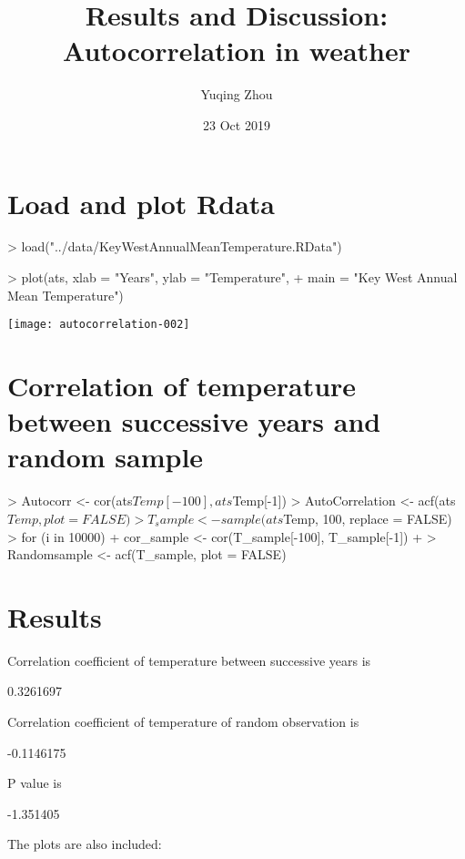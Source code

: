 \documentclass[a4paper]{article}
\title{Results and Discussion: Autocorrelation in weather}
\author{Yuqing Zhou}
\date{23 Oct 2019}
\begin{document}
 \maketitle

\section{Load and plot Rdata}
\begin{Schunk}
\begin{Sinput}
> load("../data/KeyWestAnnualMeanTemperature.RData") 
\end{Sinput}
\end{Schunk}

\begin{center}
\begin{Schunk}
\begin{Sinput}
> plot(ats, xlab = "Years", ylab = "Temperature",
+     main = "Key West Annual Mean Temperature")
\end{Sinput}
\end{Schunk}
\texttt{[image: autocorrelation-002]}
\end{center}

\section{Correlation of temperature between successive years and random sample}
\begin{Schunk}
\begin{Sinput}
> Autocorr <- cor(ats$Temp[-100],ats$Temp[-1])
> AutoCorrelation <- acf(ats$Temp, plot = FALSE)
> T_sample <- sample(ats$Temp, 100, replace = FALSE)
> for (i in 10000){
+     cor_sample <- cor(T_sample[-100], T_sample[-1])
+ }
> Randomsample <- acf(T_sample, plot = FALSE)
\end{Sinput}
\end{Schunk}

\section{Results}
Correlation coefficient of temperature between successive years is 
\begin{Schunk}
\begin{Soutput}
[1] 0.3261697
\end{Soutput}
\end{Schunk}
Correlation coefficient of temperature of random observation is 
\begin{Schunk}
\begin{Soutput}
[1] -0.1146175
\end{Soutput}
\end{Schunk}
P value is 
\begin{Schunk}
\begin{Soutput}
[1] -1.351405
\end{Soutput}
\end{Schunk}
The plots are also included:
\end{document}

